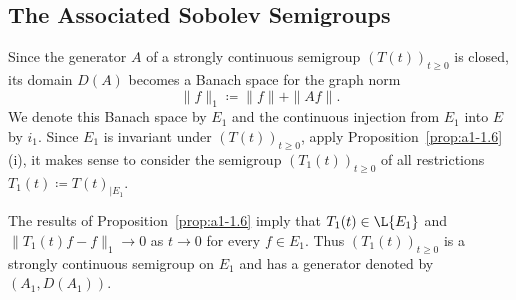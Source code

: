 \subsection{The Associated Sobolev Semigroups}\label{subsec:a1-3.6}%
Since the generator $A$ of a strongly continuous semigroup $(T(t))_{t\geq 0}$ is closed, its domain $D(A)$ becomes a Banach space for the graph norm
\[
    \|f\|_{1} \coloneqq \|f\| + \|Af\| .
\]
We denote this Banach space by $E_{1}$ and the continuous injection from $E_{1}$ into $E$ by $i_{1}$.
Since $E_{1}$ is invariant under $(T(t))_{t\geq 0}$, apply Proposition~\ref{prop:a1-1.6}\,(i), it makes sense to consider the semigroup $(T_{1}(t))_{t\geq 0}$ of all restrictions $T_{1}(t) \coloneqq T(t)_{\vert E_{1}}$.

The results of Proposition~\ref{prop:a1-1.6} imply that $T_{1}(t) \in \L{E_{1}}$ and $\|T_{1}(t)f-f\|_{1} \to 0$ as $t \to 0$ for every $f \in E_{1}$.
Thus $(T_{1}(t))_{t\geq 0}$ is a strongly continuous semigroup on $E_{1}$ and has a generator denoted by $(A_{1},D(A_{1}))$.

